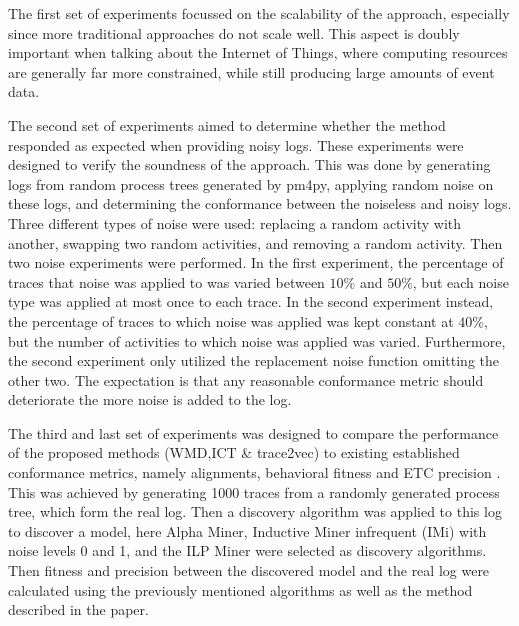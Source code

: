 \documentclass[runningheads]{template/llncs}
\begin{document}
The first set of experiments focussed on the scalability of the approach, especially since more traditional approaches do not scale well. This aspect is doubly important when talking about the Internet of Things, where computing resources are generally far more constrained, while still producing large amounts of event data.

The second set of experiments aimed to determine whether the method responded as expected when providing noisy logs.
These experiments were designed to verify the soundness of the approach.
This was done by generating logs from random process trees generated by pm4py, applying random noise on these logs, and determining the conformance between the noiseless and noisy logs.
\color{blue}
Three different types of noise were used: replacing a random activity with another, swapping two random activities, and removing a random activity.
Then  two noise experiments were performed.
In the first experiment, the percentage of traces that noise was applied to was varied between $10\%$ and $50\%$, but each noise type was applied at most once to each trace.
In the second experiment instead, the percentage of traces to which noise was applied was kept constant at $40\%$, but the number of activities to which noise was applied was varied.
Furthermore, the second experiment only utilized the replacement noise function  omitting the other two.
\color{black}
The expectation is that any reasonable conformance metric should deteriorate the more noise is added to the log.

The third and last set of experiments was designed to compare the performance of the proposed methods (WMD,ICT \& trace2vec) to existing established conformance metrics, namely alignments, behavioral fitness \cite{GMVB09} and ETC precision \cite{MuCa10}.
This was achieved by generating 1000 traces from a randomly generated process tree, which form the real log.
Then a discovery algorithm was applied to this log to discover a model, here Alpha Miner, Inductive Miner infrequent (IMi) with noise levels 0 and 1, and the ILP Miner were selected as discovery algorithms.
Then fitness and precision between the discovered model and the real log were calculated using the previously mentioned algorithms as well as the method described in the paper.

\color{blue}
\end{document}
